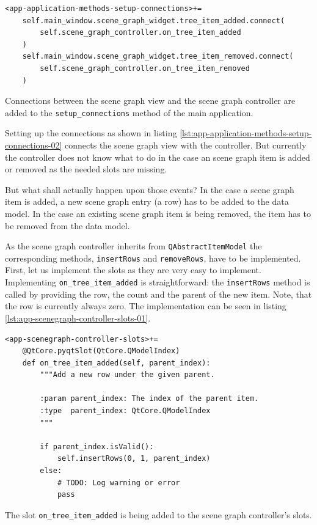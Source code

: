 \documentclass[10pt, openright, notitlepage]{scrreprt}
\begin{document}
\begin{listing}[H]
\begin{verbatim}
<app-application-methods-setup-connections>+=
    self.main_window.scene_graph_widget.tree_item_added.connect(
        self.scene_graph_controller.on_tree_item_added
    )
    self.main_window.scene_graph_widget.tree_item_removed.connect(
        self.scene_graph_controller.on_tree_item_removed
    )
\end{verbatim}
\caption{\label{lst:app-application-methods-setup-connections-02}
Connections between the scene graph view and the scene graph controller are added to the \texttt{setup\_connections} method of the main application.}
\end{listing}

Setting up the connections as shown in listing
\ref{lst:app-application-methods-setup-connections-02} connects the scene graph view
with the controller. But currently the controller does not know what to do in
the case an scene graph item is added or removed as the needed slots are
missing.

But what shall actually happen upon those events? In the case a scene graph item
is added, a new scene graph entry (a row) has to be added to the data model. In
the case an existing scene graph item is being removed, the item has to be
removed from the data model.

As the scene graph controller inherits from \texttt{QAbstractItemModel} the
corresponding methods, \texttt{insertRows} and \texttt{removeRows}, have
to be implemented. First, let us implement the slots as they are very easy to
implement. Implementing \texttt{on\_tree\_item\_added} is straightforward: the
\texttt{insertRows} method is called by providing the row, the count and
the parent of the new item. Note, that the row is currently always zero. The
implementation can be seen in listing
\ref{lst:app-scenegraph-controller-slots-01}.

\begin{listing}[H]
\begin{verbatim}
<app-scenegraph-controller-slots>+=
    @QtCore.pyqtSlot(QtCore.QModelIndex)
    def on_tree_item_added(self, parent_index):
        """Add a new row under the given parent.
    
        :param parent_index: The index of the parent item.
        :type  parent_index: QtCore.QModelIndex
        """
    
        if parent_index.isValid():
            self.insertRows(0, 1, parent_index)
        else:
            # TODO: Log warning or error
            pass
\end{verbatim}
\caption{\label{lst:app-scenegraph-controller-slots-01}
The slot \texttt{on\_tree\_item\_added} is being added to the scene graph controller's slots.}
\end{listing}
\end{document}
